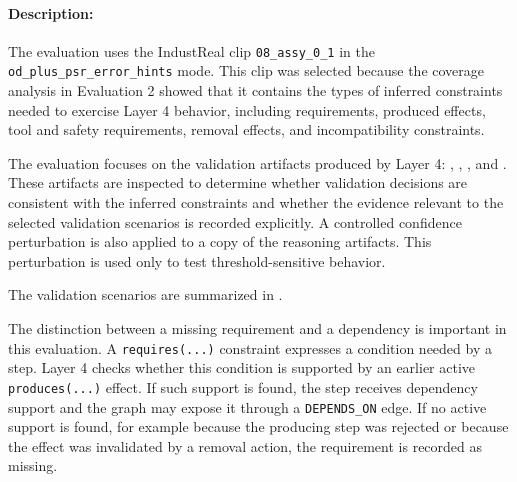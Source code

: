 \paragraph{Description:}
The evaluation uses the IndustReal clip \texttt{08\_assy\_0\_1} in the
\texttt{od\_plus\_psr\_error\_hints} mode. This clip was selected because the
coverage analysis in Evaluation 2 showed that it contains the types of inferred
constraints needed to exercise Layer 4 behavior, including requirements, produced
effects, tool and safety requirements, removal effects, and incompatibility
constraints.

The evaluation focuses on the validation artifacts produced by Layer 4:
, ,
, and . These artifacts are inspected to determine whether validation decisions are
consistent with the inferred constraints and whether the evidence relevant to the
selected validation scenarios is recorded explicitly. A controlled confidence perturbation is also applied to a copy of the reasoning artifacts. This perturbation is used only to test threshold-sensitive behavior.

The validation scenarios are summarized in
.

The distinction between a missing requirement and a dependency is important in this evaluation. A \texttt{requires(...)} constraint expresses a condition needed by a step. Layer 4 checks whether this condition is supported by an earlier active \texttt{produces(...)} effect. If such support is found, the step receives dependency support and the graph may expose it through a \texttt{DEPENDS\_ON} edge. If no active support is found, for example because the producing step was rejected or because the effect was invalidated by a removal action, the
requirement is recorded as missing.


